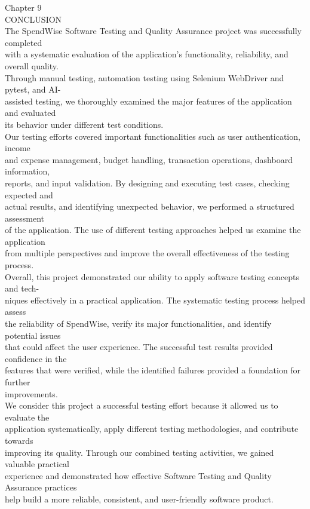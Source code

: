 \documentclass[12pt,a4paper]{report}
\begin{document}
\smallskip

\smallskip

\smallskip
Chapter 9\\ 

\smallskip
CONCLUSION\\ 

\smallskip
The SpendWise Software Testing and Quality Assurance project was successfully completed\\ 
with a systematic evaluation of the application’s functionality, reliability, and overall quality.\\ 
Through manual testing, automation testing using Selenium WebDriver and pytest, and AI-\\ 
assisted testing, we thoroughly examined the major features of the application and evaluated\\ 
its behavior under different test conditions.\\ 
Our testing efforts covered important functionalities such as user authentication, income\\ 
and expense management, budget handling, transaction operations, dashboard information,\\ 
reports, and input validation. By designing and executing test cases, checking expected and\\ 
actual results, and identifying unexpected behavior, we performed a structured assessment\\ 
of the application. The use of different testing approaches helped us examine the application\\ 
from multiple perspectives and improve the overall effectiveness of the testing process.\\ 
Overall, this project demonstrated our ability to apply software testing concepts and tech-\\ 
niques effectively in a practical application. The systematic testing process helped assess\\ 
the reliability of SpendWise, verify its major functionalities, and identify potential issues\\ 
that could affect the user experience. The successful test results provided confidence in the\\ 
features that were verified, while the identified failures provided a foundation for further\\ 
improvements.\\ 
We consider this project a successful testing effort because it allowed us to evaluate the\\ 
application systematically, apply different testing methodologies, and contribute towards\\ 
improving its quality. Through our combined testing activities, we gained valuable practical\\ 
experience and demonstrated how effective Software Testing and Quality Assurance practices\\ 
help build a more reliable, consistent, and user-friendly software product.\\ 
\end{document}
